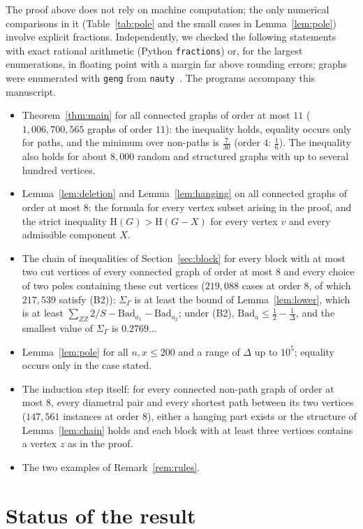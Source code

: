 \documentclass[11pt]{article}
\theoremstyle{definition}
\theoremstyle{remark}
\newcommand{\Hm}{\mathrm{H}}
\newcommand{\Bad}{\mathrm{Bad}}
\begin{document}
The proof above does not rely on machine computation; the only numerical comparisons in it
(Table~\ref{tab:pole} and the small cases in Lemma~\ref{lem:pole}) involve explicit fractions.
Independently, we checked the following statements with exact rational arithmetic (Python
\texttt{fractions}) or, for the largest enumerations, in floating point with a margin far
above rounding errors; graphs were enumerated with \texttt{geng} from
\texttt{nauty}~\cite{nauty}. The programs accompany this manuscript.
\begin{itemize}
\item Theorem~\ref{thm:main} for all connected graphs of order at most $11$
 ($1{,}006{,}700{,}565$ graphs of order $11$): the inequality holds, equality occurs only for
 paths, and the minimum over non-paths is $\frac7{30}$ (order $4$: $\frac16$). The inequality
 also holds for about $8{,}000$ random and structured graphs with up to several hundred
 vertices.
\item Lemma~\ref{lem:deletion} and Lemma~\ref{lem:hanging} on all connected graphs of order at
 most $8$: the formula for every vertex subset arising in the proof, and the strict
 inequality $\Hm(G)>\Hm(G-X)$ for every vertex $v$ and every admissible component $X$.
\item The chain of inequalities of Section~\ref{sec:block} for every block with at most two
 cut vertices of every connected graph of order at most $8$ and every choice of two poles
 containing these cut vertices ($219{,}088$ cases at order $8$, of which $217{,}539$ satisfy
 \textup{(B2)}): $\Sigma_\Gamma$ is at least the bound of Lemma~\ref{lem:lower}, which is at
 least $\sum_{ZZ}2/S-\Bad_{a_1}-\Bad_{a_2}$; under \textup{(B2)},
 $\Bad_a\le\frac12-\frac1\Delta$, and the smallest value of $\Sigma_\Gamma$ is
 $0.2769\ldots$
\item Lemma~\ref{lem:pole} for all $n,x\le200$ and a range of $\Delta$ up to $10^5$; equality
 occurs only in the case stated.
\item The induction step itself: for every connected non-path graph of order at most $8$,
 every diametral pair and every shortest path between its two vertices ($147{,}561$ instances
 at order $8$), either a hanging part exists or the structure of Lemma~\ref{lem:chain} holds
 and each block with at least three vertices contains a vertex $z$ as in the proof.
\item The two examples of Remark~\ref{rem:rules}.
\end{itemize}

\section{Status of the result}\label{sec:status}
\end{document}
